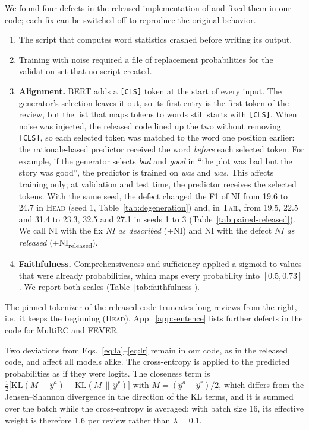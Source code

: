 \documentclass[11pt]{article}
\newcommand{\HEAD}{\textup{\textsc{Head}}}
\newcommand{\TAIL}{\textup{\textsc{Tail}}}
\begin{document}
We found four defects in the released implementation of \citet{storek-etal-2023-unsupervised} and fixed them in our code; each fix can be switched off to reproduce the original behavior.
\begin{enumerate}
  \setlength\itemsep{1pt}
  \item The script that computes word statistics crashed before writing its output.
  \item Training with noise required a file of replacement probabilities for the validation set that no script created.
  \item \textbf{Alignment.} BERT adds a \texttt{[CLS]} token at the start of every input. The generator's selection leaves it out, so its first entry is the first token of the review, but the list that maps tokens to words still starts with \texttt{[CLS]}. When noise was injected, the released code lined up the two without removing \texttt{[CLS]}, so each selected token was matched to the word one position earlier: the rationale-based predictor received the word \emph{before} each selected token. For example, if the generator selects \emph{bad} and \emph{good} in ``the plot was bad but the story was good'', the predictor is trained on \emph{was} and \emph{was}. This affects training only; at validation and test time, the predictor receives the selected tokens. With the same seed, the defect changed the F1 of NI from 19.6 to 24.7 in \HEAD{} (seed 1, Table~\ref{tab:degeneration}) and, in \TAIL, from 19.5, 22.5 and 31.4 to 23.3, 32.5 and 27.1 in seeds 1 to 3 (Table~\ref{tab:paired-released}). We call NI with the fix \emph{NI as described} (+NI) and NI with the defect \emph{NI as released} (+NI\textsubscript{released}).
  \item \textbf{Faithfulness.} Comprehensiveness and sufficiency applied a sigmoid to values that were already probabilities, which maps every probability into $[0.5, 0.73]$. We report both scales (Table~\ref{tab:faithfulness}).
\end{enumerate}
The pinned tokenizer of the released code truncates long reviews from the right, i.e.\ it keeps the beginning (\HEAD). App.~\ref{app:sentence} lists further defects in the code for MultiRC and FEVER.

Two deviations from Eqs.~\ref{eq:la}--\ref{eq:lr} remain in our code, as in the released code, and affect all models alike. The cross-entropy is applied to the predicted probabilities as if they were logits. The closeness term is $\frac{1}{2}\big[\mathrm{KL}(M \,\|\, \hat{y}^a) + \mathrm{KL}(M \,\|\, \hat{y}^r)\big]$ with $M = (\hat{y}^a + \hat{y}^r)/2$, which differs from the Jensen--Shannon divergence in the direction of the KL terms, and it is summed over the batch while the cross-entropy is averaged; with batch size 16, its effective weight is therefore 1.6 per review rather than $\lambda = 0.1$.
\end{document}
